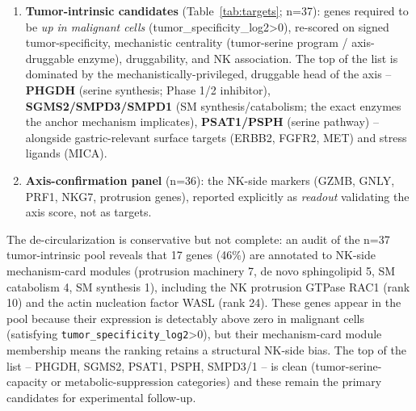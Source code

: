 \documentclass[modern,large,numbered,nocrop]{oup-authoring-template}
\begin{document}
\begin{enumerate}
\item \textbf{Tumor-intrinsic candidates} (Table~\ref{tab:targets}; n=37): genes required to be \textit{up in malignant cells} (tumor\_specificity\_log2>0), re-scored on signed tumor-specificity, mechanistic centrality (tumor-serine program / axis-druggable enzyme), druggability, and NK association. The top of the list is dominated by the mechanistically-privileged, druggable head of the axis -- \textbf{PHGDH} (serine synthesis; Phase 1/2 inhibitor), \textbf{SGMS2/SMPD3/SMPD1} (SM synthesis/catabolism; the exact enzymes the anchor mechanism implicates), \textbf{PSAT1/PSPH} (serine pathway) -- alongside gastric-relevant surface targets (ERBB2, FGFR2, MET) and stress ligands (MICA).
\item \textbf{Axis-confirmation panel} (n=36): the NK-side markers (GZMB, GNLY, PRF1, NKG7, protrusion genes), reported explicitly as \textit{readout} validating the axis score, not as targets.
\end{enumerate}

The de-circularization is conservative but not complete: an audit of the n=37 tumor-intrinsic pool reveals that 17 genes (46\%) are annotated to NK-side mechanism-card modules (protrusion machinery 7, de novo sphingolipid 5, SM catabolism 4, SM synthesis 1), including the NK protrusion GTPase RAC1 (rank 10) and the actin nucleation factor WASL (rank 24). These genes appear in the pool because their expression is detectably above zero in malignant cells (satisfying \texttt{tumor\_specificity\_log2}>0), but their mechanism-card module membership means the ranking retains a structural NK-side bias. The top of the list -- PHGDH, SGMS2, PSAT1, PSPH, SMPD3/1 -- is clean (tumor-serine-capacity or metabolic-suppression categories) and these remain the primary candidates for experimental follow-up.
\end{document}
